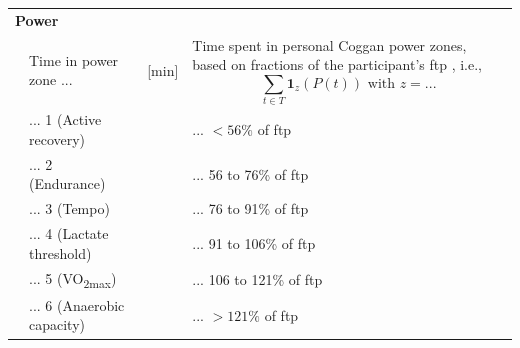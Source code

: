 \documentclass[11pt,a4paper]{article}
\begin{document}
\begin{threeparttable}[hbtp]
\begin{tabular}{l p{3.5cm} c p{11.2cm}}
        \multicolumn{2}{l}{\textbf{Power}}\\
        & Time in power zone ... & [min] & Time spent in personal Coggan power zones, based on fractions of the participant's \gls{ftp} \cite{1937716155}, i.e., \begin{equation}\sum_{t\in T} \boldsymbol{1}_{z}(P(t)) \text{ with } z = ...\end{equation}\\
        & ... 1 (Active recovery) & & ... $<56\%$ of \gls{ftp}\\ %
        & ... 2 (Endurance) & & ... 56 to 76\% of \gls{ftp}\\%
        & ... 3 (Tempo) & & ... 76 to 91\% of \gls{ftp}\\ %
        & ... 4 (Lactate threshold) & & ... 91 to 106\% of \gls{ftp}\\%
        & ... 5 (VO\textsubscript{2max}) & & ... 106 to 121\% of \gls{ftp}\\%
        & ... 6 (Anaerobic capacity) & & ... $>121\%$ of \gls{ftp}\\%
        

\end{tabular}
\end{threeparttable}
\end{document}
